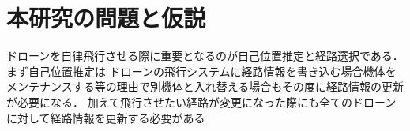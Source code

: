 \section{本研究の問題と仮説}
ドローンを自律飛行させる際に重要となるのが自己位置推定と経路選択である．
まず自己位置推定は
ドローンの飛行システムに経路情報を書き込む場合機体をメンテナンスする等の理由で別機体と入れ替える場合もその度に経路情報の更新が必要になる．
加えて飛行させたい経路が変更になった際にも全てのドローンに対して経路情報を更新する必要がある